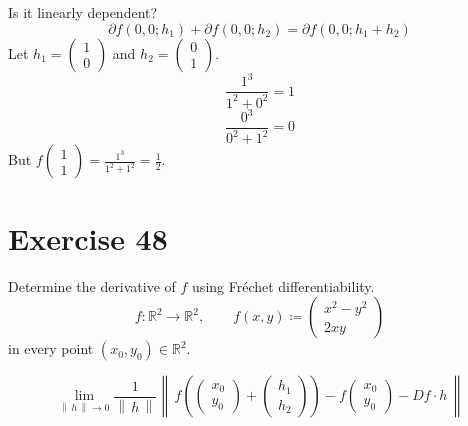 \documentclass[a4paper]{article}
\theoremstyle{definition}
\newcommand\norm[1]{\left\|\,#1\,\right\|}
\begin{document}
Is it linearly dependent?
\[ \partial f(0, 0; h_1) + \partial f(0, 0; h_2) = \partial f(0, 0; h_1 + h_2) \]
Let $h_1 = \begin{pmatrix} 1 \\ 0 \end{pmatrix}$ and $h_2 = \begin{pmatrix} 0 \\ 1 \end{pmatrix}$.
\[ \frac{1^3}{1^2 + 0^2} = 1 \]
\[ \frac{0^3}{0^2 + 1^2} = 0 \]
But $f\begin{pmatrix} 1 \\ 1 \end{pmatrix} = \frac{1^3}{1^2 + 1^2} = \frac12$.


\section{Exercise 48}
\begin{ex}
  Determine the derivative of $f$ using Fr\'echet differentiability.
  \[ f: \mathbb R^2 \to \mathbb R^2, \qquad f(x,y) \coloneqq \begin{pmatrix} x^2 - y^2 \\ 2xy \end{pmatrix} \]
  in every point $(x_0, y_0) \in \mathbb R^2$.
\end{ex}

\[ \lim_{\norm{h}\to0} \frac{1}{\norm{h}} \norm{f\left(\begin{pmatrix} x_0 \\ y_0 \end{pmatrix} + \begin{pmatrix} h_1 \\ h_2 \end{pmatrix}\right) - f\begin{pmatrix} x_0 \\ y_0 \end{pmatrix} - Df \cdot h} \]
\end{document}
